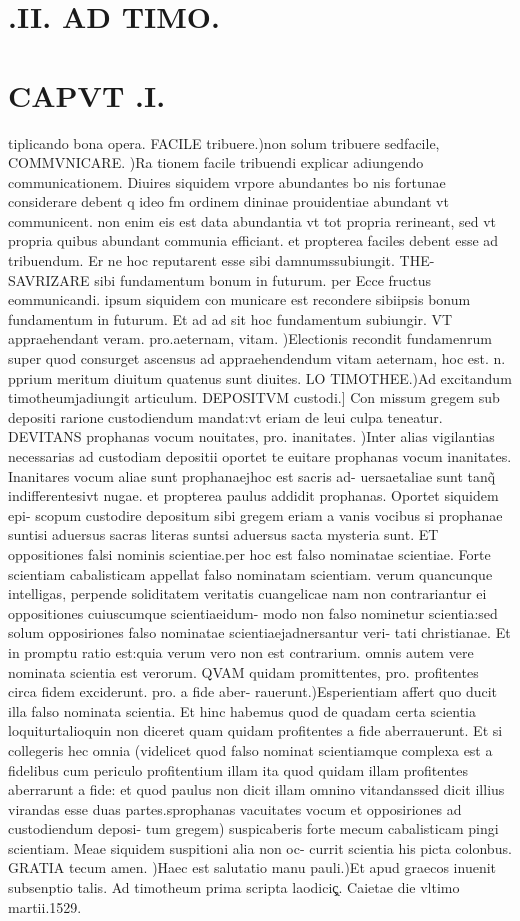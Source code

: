 \documentclass{article}
\begin{document}
\begin{pages}
\section*{.II. AD TIMO. }
\section*{CAPVT .I. }\pstart tiplicando bona opera. FACILE tribuere.)non solum tribuere sedfacile, COMMVNICARE. )Ra tionem facile tribuendi explicar adiungendo communicationem. Diuires siquidem vrpore abundantes bo nis fortunae considerare debent q ideo fm ordinem dininae prouidentiae abundant vt communicent. non enim eis est data abundantia vt tot propria rerineant, sed vt propria quibus abundant communia efficiant. et propterea faciles debent esse ad tribuendum. Er ne hoc reputarent esse sibi damnumssubiungit. THE- SAVRIZARE sibi fundamentum bonum in futurum. per Ecce fructus eommunicandi. ipsum siquidem con municare est recondere sibiipsis bonum fundamentum in futurum. Et ad ad sit hoc fundamentum subiungir. VT appraehendant veram. pro.aeternam, vitam. )Electionis recondit fundamenrum super quod consurget ascensus ad appraehendendum vitam aeternam, hoc est. n. pprium meritum diuitum quatenus sunt diuites. LO TIMOTHEE.)Ad excitandum timotheumjadiungit articulum. DEPOSITVM custodi.] Con missum gregem sub depositi rarione custodiendum mandat:vt eriam de leui culpa teneatur. DEVITANS prophanas vocum nouitates, pro. inanitates. )Inter alias vigilantias necessarias ad custodiam depositii oportet te euitare prophanas vocum inanitates. Inanitares vocum aliae sunt prophanaejhoc est sacris ad- uersaetaliae sunt tanq̃ indifferentesivt nugae. et propterea paulus addidit prophanas. Oportet siquidem epi- scopum custodire depositum sibi gregem eriam a vanis vocibus si prophanae suntisi aduersus sacras literas suntsi aduersus sacta mysteria sunt. ET oppositiones falsi nominis scientiae.per hoc est falso nominatae scientiae. Forte scientiam cabalisticam appellat falso nominatam scientiam. verum quancunque intelligas, perpende soliditatem veritatis cuangelicae nam non contrariantur ei oppositiones cuiuscumque scientiaeidum- modo non falso nominetur scientia:sed solum opposiriones falso nominatae scientiaejadnersantur veri- tati christianae. Et in promptu ratio est:quia verum vero non est contrarium. omnis autem vere nominata scientia est verorum. QVAM quidam promittentes, pro. profitentes circa fidem exciderunt. pro. a fide aber- rauerunt.)Esperientiam affert quo ducit illa falso nominata scientia. Et hinc habemus quod de quadam certa scientia loquiturtalioquin non diceret quam quidam profitentes a fide aberrauerunt. Et si collegeris hec omnia (videlicet quod falso nominat scientiamque complexa est a fidelibus cum periculo profitentium illam ita quod quidam illam profitentes aberrarunt a fide: et quod paulus non dicit illam omnino vitandanssed dicit illius virandas esse duas partes.sprophanas vacuitates vocum et opposiriones ad custodiendum deposi- tum gregem) suspicaberis forte mecum cabalisticam pingi scientiam. Meae siquidem suspitioni alia non oc- currit scientia his picta colonbus. GRATIA tecum amen. )Haec est salutatio manu pauli.)Et apud graecos inuenit subsenptio talis. Ad timotheum prima scripta laodiciç̨. Caietae die vltimo martii.1529.  \pend

\end{pages}
\end{document}
